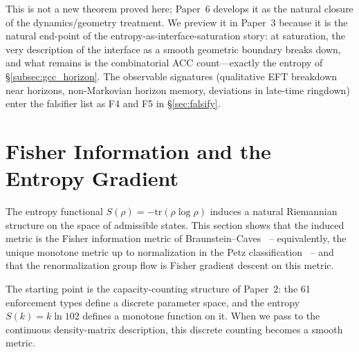 \documentclass[11pt]{article}
\begin{document}
This is not a new theorem proved here; Paper~6 develops it as the natural
closure of the dynamics/geometry treatment.  We preview it in Paper~3
because it is the natural end-point of the entropy-as-interface-saturation
story: at saturation, the very description of the interface as a smooth
geometric boundary breaks down, and what remains is the combinatorial ACC
count---exactly the entropy of \S\ref{subsec:gcc_horizon}.  The
observable signatures (qualitative EFT breakdown near horizons,
non-Markovian horizon memory, deviations in late-time ringdown) enter the
falsifier list as F4 and F5 in \S\ref{sec:falsify}.


\section{Fisher Information and the Entropy Gradient}
\label{sec:fisher}

The entropy functional $S(\rho) = -\mathrm{tr}(\rho\log\rho)$ induces a
natural Riemannian structure on the space of admissible states.  This section
shows that the induced metric is the Fisher information metric of
Braunstein--Caves~\cite{BraunsteinCaves1994} -- equivalently, the unique
monotone metric up to normalization in the Petz classification~\cite{Petz1996,AmariNagaoka2000}
-- and that the renormalization group flow is Fisher gradient descent on this metric.

The starting point is the capacity-counting structure of Paper~2: the 61
enforcement types define a discrete parameter space, and the entropy $S(k) =
k\ln 102$ defines a monotone function on it.  When we pass to the
continuous density-matrix description, this discrete counting becomes a
smooth metric.
\end{document}
